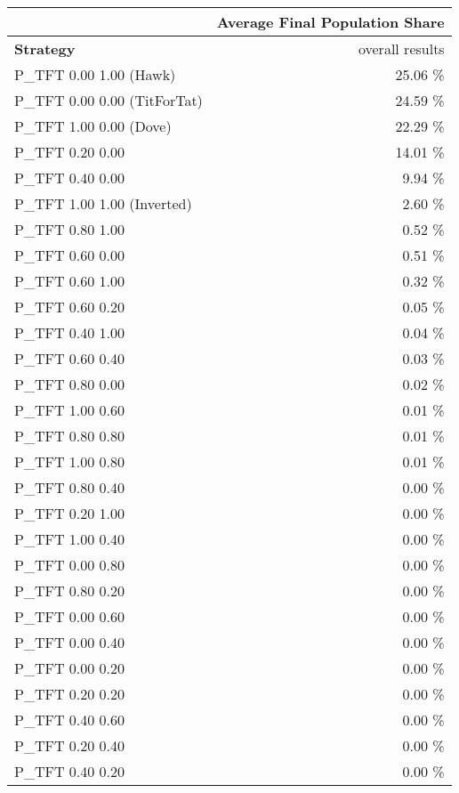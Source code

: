 \begin{tabular}{|l|r|}
\hline
 & \multicolumn{1}{c|}{{\bf Average Final Population Share}} \\
\hline
{\bf Strategy} & overall results\\ \hline
P\_TFT 0.00 1.00 (Hawk)       &   25.06 \% \\
P\_TFT 0.00 0.00 (TitForTat)  &   24.59 \% \\
P\_TFT 1.00 0.00 (Dove)       &   22.29 \% \\
P\_TFT 0.20 0.00              &   14.01 \% \\
P\_TFT 0.40 0.00              &    9.94 \% \\
P\_TFT 1.00 1.00 (Inverted)   &    2.60 \% \\
P\_TFT 0.80 1.00              &    0.52 \% \\
P\_TFT 0.60 0.00              &    0.51 \% \\
P\_TFT 0.60 1.00              &    0.32 \% \\
P\_TFT 0.60 0.20              &    0.05 \% \\
P\_TFT 0.40 1.00              &    0.04 \% \\
P\_TFT 0.60 0.40              &    0.03 \% \\
P\_TFT 0.80 0.00              &    0.02 \% \\
P\_TFT 1.00 0.60              &    0.01 \% \\
P\_TFT 0.80 0.80              &    0.01 \% \\
P\_TFT 1.00 0.80              &    0.01 \% \\
P\_TFT 0.80 0.40              &    0.00 \% \\
P\_TFT 0.20 1.00              &    0.00 \% \\
P\_TFT 1.00 0.40              &    0.00 \% \\
P\_TFT 0.00 0.80              &    0.00 \% \\
P\_TFT 0.80 0.20              &    0.00 \% \\
P\_TFT 0.00 0.60              &    0.00 \% \\
P\_TFT 0.00 0.40              &    0.00 \% \\
P\_TFT 0.00 0.20              &    0.00 \% \\
P\_TFT 0.20 0.20              &    0.00 \% \\
P\_TFT 0.40 0.60              &    0.00 \% \\
P\_TFT 0.20 0.40              &    0.00 \% \\
P\_TFT 0.40 0.20              &    0.00 \% \\

\end{tabular}
